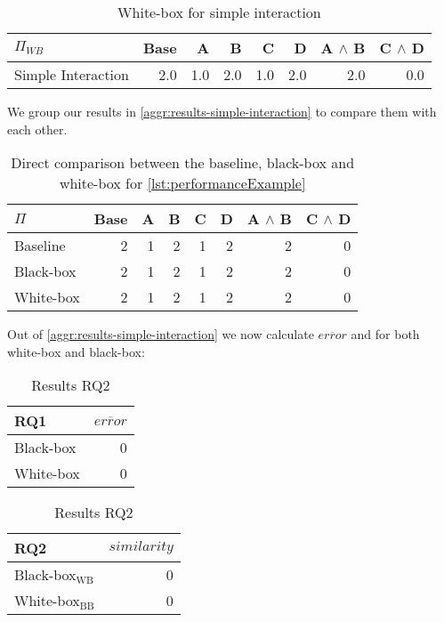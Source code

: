 \begin{table}[H]
    \centering
    \begin{tabular}{lrrrrrrr}
    \toprule
    $\Pi_{WB}$    & Base & A & B & C & D & A $\land$ B & C $\land$ D  \\
    \midrule
    Simple Interaction &   2.0 &  1.0 &  2.0 &  1.0 &  2.0 &   2.0 &  0.0 \\
    \bottomrule
    \end{tabular}
    \caption{White-box {\perfInfluenceModel} for simple interaction}
\end{table}

We group our results in \autoref{aggr:results-simple-interaction} to compare them with each other.

\begin{table}[H]
    \centering
    \begin{tabular}{lrrrrrrr}
    \toprule
    $\Pi$    & Base & A & B & C & D & A $\land$ B & C $\land$ D  \\ \midrule
    Baseline & 2    & 1 & 2 & 1 & 2 & 2           & 0            \\
    Black-box & 2    & 1 & 2 & 1 & 2 & 2           & 0           \\
    White-box & 2    & 1 & 2 & 1 & 2 & 2           & 0           \\ \bottomrule
    \end{tabular}  
    \caption{Direct comparison between the baseline, black-box and white-box {\perfInfluenceModel} for \autoref{lst:performanceExample}}\label{aggr:results-simple-interaction}
\end{table}

Out of \autoref{aggr:results-simple-interaction} we now calculate $\overline{error}$ and %
for both white-box and black-box:

\begin{table}[H]
\begin{minipage}{.5\linewidth}
    \centering
    \begin{tabular}{lr}
    \toprule
    RQ1     & $\overline{error}$         \\ \midrule
    Black-box & 0              \\
    White-box & 0              \\ \bottomrule
    \end{tabular}  
    \caption{Results RQ1}
\end{minipage}%
\begin{minipage}{.5\linewidth}
    \centering
    \begin{tabular}{lr}
        \toprule
        RQ2     & $similarity$    \\ \midrule
        Black-box$_\text{WB}$ & 0              \\
        White-box$_\text{BB}$ & 0              \\ \bottomrule
        \end{tabular}  
        \caption{Results RQ2}
\end{minipage} 
\end{table}

